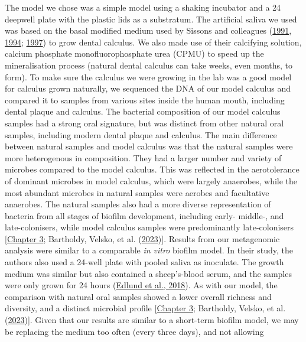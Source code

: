 \documentclass[
  letterpaper,
]{book}
\begin{document}
The model we chose was a simple model using a shaking incubator and a 24
deepwell plate with the plastic lids as a substratum. The artificial
saliva we used was based on the basal modified medium used by Sissons
and colleagues
(\protect\hyperlink{ref-sissonsMultistationPlaque1991}{1991},
\protect\hyperlink{ref-sissonsPHResponse1994}{1994};
\protect\hyperlink{ref-sissonsArtificialPlaque1997}{1997}) to grow
dental calculus. We also made use of their calcifying solution, calcium
phosphate monofluorophosphate urea (CPMU) to speed up the mineralisation
process (natural dental calculus can take weeks, even months, to form).
To make sure the calculus we were growing in the lab was a good model
for calculus grown naturally, we sequenced the DNA of our model calculus
and compared it to samples from various sites inside the human mouth,
including dental plaque and calculus. The bacterial composition of our
model calculus samples had a strong oral signature, but was distinct
from other natural oral samples, including modern dental plaque and
calculus. The main difference between natural samples and model calculus
was that the natural samples were more heterogenous in composition. They
had a larger number and variety of microbes compared to the model
calculus. This was reflected in the aerotolerance of dominant microbes
in model calculus, which were largely anaerobes, while the most abundant
microbes in natural samples were aerobes and facultative anaerobes. The
natural samples also had a more diverse representation of bacteria from
all stages of biofilm development, including early- middle-, and
late-colonisers, while model calculus samples were predominantly
late-colonisers {[}\protect\hyperlink{byoc-valid}{Chapter 3}; Bartholdy,
Velsko, et al.
(\protect\hyperlink{ref-bartholdyAssessingValidity2023}{2023}){]}.
Results from our metagenomic analysis were similar to a comparable
\emph{in vitro} biofilm model. In their study, the authors also used a
24-well plate with pooled saliva as inoculate. The growth medium was
similar but also contained a sheep's-blood serum, and the samples were
only grown for 24 hours
(\protect\hyperlink{ref-edlundUncoveringComplex2018}{Edlund et al.,
2018}). As with our model, the comparison with natural oral samples
showed a lower overall richness and diversity, and a distinct microbial
profile {[}\protect\hyperlink{byoc-valid}{Chapter 3}; Bartholdy, Velsko,
et al.
(\protect\hyperlink{ref-bartholdyAssessingValidity2023}{2023}){]}. Given
that our results are similar to a short-term biofilm model, we may be
replacing the medium too often (every three days), and not allowing
\end{document}
